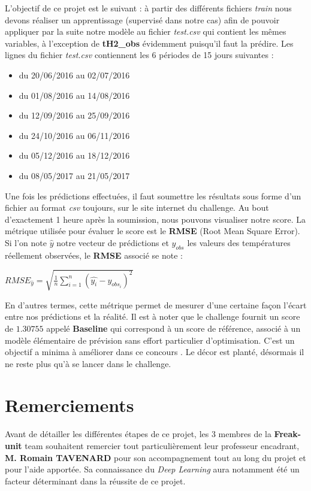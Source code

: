 \documentclass[14pt, openany]{article}
\begin{document}
L'objectif de ce projet est le suivant : à partir des différents fichiers \textit{train} nous devons réaliser un apprentissage (supervisé dans notre cas) afin de pouvoir appliquer par la suite notre modèle au fichier \textit{test.csv} qui contient les mêmes variables, à l'exception de \textbf{tH2\_obs} évidemment puisqu'il faut la prédire. Les lignes du fichier \textit{test.csv} contiennent les 6 périodes de 15 jours suivantes :
\begin{itemize}
\item du 20/06/2016 au 02/07/2016
\item du 01/08/2016 au 14/08/2016
\item du 12/09/2016 au 25/09/2016
\item du 24/10/2016 au 06/11/2016
\item du 05/12/2016 au 18/12/2016
\item du 08/05/2017 au 21/05/2017
\end{itemize}
Une fois les prédictions effectuées, il faut soumettre les résultats sous forme d'un fichier au format \textit{csv} toujours, sur le site internet du challenge. Au bout d'exactement 1 heure après la soumission, nous pouvons visualiser notre score. La métrique utilisée pour évaluer le score est le \textbf{RMSE} (Root Mean Square Error). Si l'on note $\hat{y}$ notre vecteur de prédictions et $y_{obs}$ les valeurs des températures réellement observées, le \textbf{RMSE} associé se note :\\
\begin{center}
$RMSE_{\hat{y}} = \sqrt{\frac{1}{n} \sum\limits_{i=1}^n (\hat{y_i}-y_{obs_i})^2}$
\end{center}
En d'autres termes, cette métrique permet de mesurer d'une certaine façon l'écart entre nos prédictions et la réalité. Il est à noter que le challenge fournit un score de $1.30755$ appelé \textbf{Baseline} qui correspond à un score de référence, associé à \og un modèle élémentaire de prévision sans effort particulier d'optimisation. C'est un objectif a minima à améliorer dans ce concours \fg{}. Le décor est planté, désormais il ne reste plus qu'à se lancer dans le challenge.
\section{Remerciements}
\paragraph{}
Avant de détailler les différentes étapes de ce projet, les 3 membres de la \textbf{Freak-unit} team souhaitent remercier tout particulièrement leur professeur encadrant, \textbf{M. Romain TAVENARD} pour son accompagnement tout au long du projet et pour l'aide apportée. Sa connaissance du \textit{Deep Learning} aura notamment été un facteur déterminant dans la réussite de ce projet.
\end{document}
